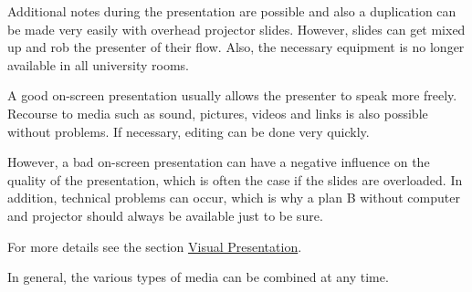 \documentclass[
  english,
]{scrreprt}
\begin{document}
Additional notes during the presentation are possible and also a duplication can be made very easily with overhead projector slides. However, slides can get mixed up and rob the presenter of their flow. Also, the necessary equipment is no longer available in all university rooms.

A good on-screen presentation usually allows the presenter to speak more freely. Recourse to media such as sound, pictures, videos and links is also possible without problems. If necessary, editing can be done very quickly.

However, a bad on-screen presentation can have a negative influence on the quality of the presentation, which is often the case if the slides are overloaded. In addition, technical problems can occur, which is why a plan B without computer and projector should always be available just to be sure.

For more details see the section \hyperref[sec:visual_presentation]{Visual Presentation}.

In general, the various types of media can be combined at any time.
\end{document}
